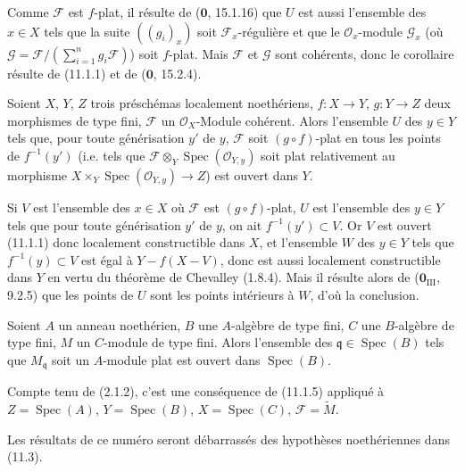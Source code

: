 
Comme $\mathcal F$ est $f$-plat, il résulte de ($\mathbf 0$, 15.1.16) que $U$
est aussi l'ensemble des $x\in X$ tels que la suite $((g_i)_x)$ soit
$\mathcal F_x$-régulière et que le $\mathcal O_x$-module $\mathcal G_x$ (où
$\mathcal G=\mathcal F/(\sum_{i=1}^n g_i\mathcal F)$) soit $f$-plat. Mais
$\mathcal F$ et $\mathcal G$ sont cohérents, donc le corollaire résulte de
(11.1.1) et de ($\mathbf 0$, 15.2.4).

\begin{corollary}[11.1.5]
\label{IV.11.1.5-fr}
Soient $X$, $Y$, $Z$ trois préschémas localement noethériens,
$f:X\to Y$, $g:Y\to Z$ deux morphismes de type fini, $\mathcal F$ un
$\mathcal O_X$-Module cohérent. Alors l'ensemble $U$ des $y\in Y$ tels que,
pour toute générisation $y'$ de $y$, $\mathcal F$ soit $(g\circ f)$-plat en
tous les points de $f^{-1}(y')$ (i.e. tels que
$\mathcal F\otimes_Y\operatorname{Spec}(\mathcal O_{Y,y})$ soit plat
relativement au morphisme
$X\times_Y\operatorname{Spec}(\mathcal O_{Y,y})\to Z$) est ouvert dans $Y$.
\end{corollary}

Si $V$ est l'ensemble des $x\in X$ où $\mathcal F$ est $(g\circ f)$-plat, $U$
est l'ensemble des $y\in Y$ tels que pour toute générisation $y'$ de $y$, on
ait $f^{-1}(y')\subset V$. Or $V$ est ouvert (11.1.1) donc localement
constructible dans $X$, et l'ensemble $W$ des $y\in Y$ tels que
$f^{-1}(y)\subset V$ est égal à $Y-f(X-V)$, donc est aussi localement
constructible dans $Y$ en vertu du théorème de Chevalley (1.8.4). Mais il
résulte alors de ($\mathbf 0_{\mathrm{III}}$, 9.2.5) que les points de $U$ sont
les points intérieurs à $W$, d'où la conclusion.

\begin{corollary}[11.1.6]
\label{IV.11.1.6-fr}
Soient $A$ un anneau noethérien, $B$ une $A$-algèbre de type fini, $C$ une
$B$-algèbre de type fini, $M$ un $C$-module de type fini. Alors l'ensemble des
$\mathfrak q\in\operatorname{Spec}(B)$ tels que $M_{\mathfrak q}$ soit un
$A$-module plat est ouvert dans $\operatorname{Spec}(B)$.
\end{corollary}

Compte tenu de (2.1.2), c'est une conséquence de (11.1.5) appliqué à
$Z=\operatorname{Spec}(A)$, $Y=\operatorname{Spec}(B)$,
$X=\operatorname{Spec}(C)$, $\mathcal F=\widetilde M$.

Les résultats de ce numéro seront débarrassés des hypothèses noethériennes
dans (11.3).

